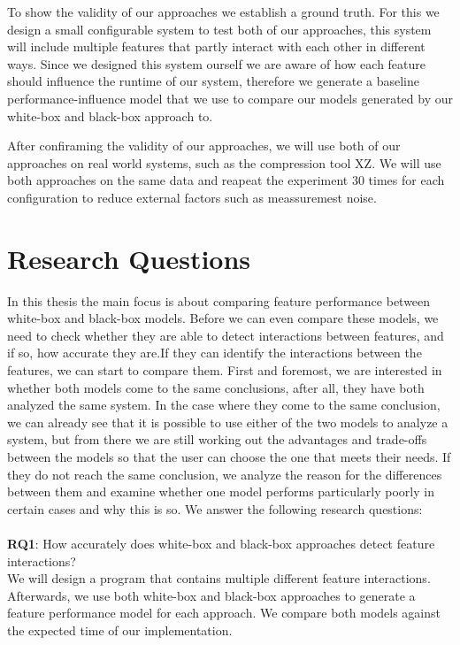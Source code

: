 To show the validity of our approaches we establish a ground truth. For this we design a small configurable system to test both of our 
approaches, this system will include multiple features that partly interact with each other in different ways. Since we designed this system
ourself we are aware of how each feature should influence the runtime of our system, therefore we generate a baseline performance-influence 
model that we use to compare our models generated by our white-box and black-box approach to.

After confiraming the validity of our approaches, we will use both of our approaches on real world systems, such as the compression tool
XZ. We will use both approaches on the same data and reapeat the experiment 30 times for each configuration to reduce external factors such
as meassuremest noise.

\section{Research Questions}

In this thesis the main focus is about comparing feature performance between white-box and black-box models. 
Before we can even compare these models, we need to check whether they are able to detect interactions between features, 
and if so, how accurate they are.If they can identify the interactions between the features, we can start to compare them. 
First and foremost, we are interested in whether both models come to the same conclusions, after all, 
they have both analyzed the same system. In the case where they come to the same conclusion, 
we can already see that it is possible to use either of the two models to analyze a system, 
but from there we are still working out the advantages and trade-offs between the models so that the user can choose the one that meets 
their needs. If they do not reach the same conclusion, we analyze the reason for the differences between them and examine whether one model 
performs particularly poorly in certain cases and why this is so. We answer the following research questions:\\\\

\noindent \textbf{RQ1}: How accurately does white-box and black-box approaches detect feature interactions? \\

\noindent We will design a program that contains multiple different feature interactions. Afterwards, we use both white-box and black-box approaches to generate a feature performance model for each approach.  We compare both models against the expected time of our implementation. \\

